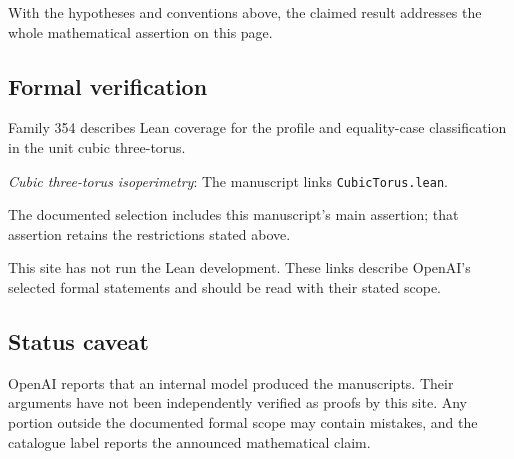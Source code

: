 \documentclass[11pt]{article}
\begin{document}
With the hypotheses and conventions above, the claimed result addresses the whole mathematical assertion on this page.

\subsection{Formal verification}
Family 354 describes Lean coverage for the profile and equality-case classification in the unit cubic three-torus.

\textit{Cubic three-torus isoperimetry}: The manuscript links \texttt{CubicTorus.lean}.

The documented selection includes this manuscript’s main assertion; that assertion retains the restrictions stated above.

This site has not run the Lean development. These links describe OpenAI’s selected formal statements and should be read with their stated scope.

\subsection{Status caveat}
OpenAI reports that an internal model produced the manuscripts. Their arguments have not been independently verified as proofs by this site. Any portion outside the documented formal scope may contain mistakes, and the catalogue label reports the announced mathematical claim.
\end{document}
